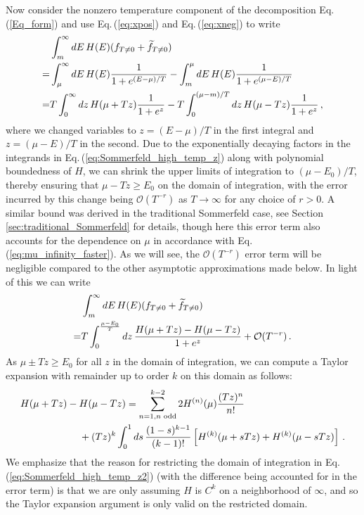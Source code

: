\documentclass[sn-mathphys,Numbered]{sn-jnl}
\newcommand{\req}[1]{Eq.\,(\ref{#1})}
\begin{document}
Now consider the nonzero temperature component of the decomposition \req{Eq_form} and use \req{eq:xpos} and \req{eq:xneg} to write
\begin{align}
 &\int_m^\infty dE\, H(E)(f_{T\neq 0}+\widetilde{f}_{T\neq 0})\notag\\
 =&\int_\mu^\infty dE \,H(E)\frac{1}{1+e^{(E-\mu)/T}}-\int_m^\mu dE\, H(E)\frac{1}{1+e^{(\mu-E)/T}}\notag\\
=&T\int_0^\infty dz \,H(\mu+Tz)\frac{1}{1+e^{z}}-T\int^{(\mu-m)/T}_0 dz\, H(\mu-Tz)\frac{1}{1+e^{z}}\,,\label{eq:Sommerfeld_high_temp_z}
\end{align}
where we changed variables to $z=(E-\mu)/T$ in the first integral and $z=(\mu-E)/T$ in the second. Due to the exponentially decaying factors in the integrands in \req{eq:Sommerfeld_high_temp_z} along with polynomial boundedness of $H$, we can shrink the upper limits of integration to $(\mu-E_0)/T$, thereby ensuring that $\mu-Tz\geq E_0$ on the domain of integration, with the error incurred by this change being $\mathcal{O}(T^{-r})$ as $T\to \infty$ for any choice of $r>0$. A similar bound was derived in the traditional Sommerfeld case, see Section \ref{sec:traditional_Sommerfeld} for details, though here this error term also accounts for the dependence on $\mu$ in accordance with \req{eq:mu_infinity_faster}. As we will see, the $\mathcal{O}(T^{-r})$ error term will be negligible compared to the other asymptotic approximations made below. In light of this we can write
\begin{align}
 &\int_m^\infty dE\, H(E)(f_{T\neq 0}+\widetilde{f}_{T\neq 0})\notag\\
=&T\int_0^{\frac{\mu-E_0}{T}} dz \,\frac{H(\mu+Tz)- H(\mu-Tz)}{1+e^{z}}+\mathcal{O}(T^{-r})\,. \label{eq:Sommerfeld_high_temp_z2}
\end{align}
As $\mu\pm Tz\geq E_0$ for all $z$ in the domain of integration, we can compute a Taylor expansion with remainder up to order $k$ on this domain as follows:
\begin{align}\label{eq:H_diff_Taylor}
 &H(\mu+Tz)- H(\mu-Tz)=\sum_{n=1,n\text{ odd}}^{k-2} 2H^{(n)}(\mu)\frac{(Tz)^n}{n!}\\
 &\qquad\qquad\qquad+(Tz)^k \int_0^1 ds\,\frac{(1-s)^{k-1}}{(k-1)!} \left[H^{(k)}(\mu+sTz)+H^{(k)}(\mu-sTz)\right]\,. \notag
\end{align}
We emphasize that the reason for restricting the domain of integration in \req{eq:Sommerfeld_high_temp_z2} (with the difference being accounted for in the error term) is that we are only assuming $H$ is $C^k$ on a neighborhood of $\infty$, and so the Taylor expansion argument is only valid on the restricted domain.
\end{document}
